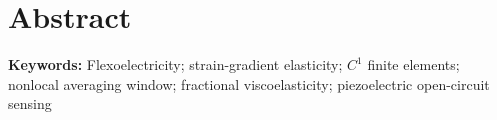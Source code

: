 \documentclass[11pt]{article}
\begin{document}
\section*{Abstract}

\bigskip
\noindent\textbf{Keywords:} Flexoelectricity; strain-gradient elasticity; $C^1$ finite elements; nonlocal averaging window; fractional viscoelasticity; piezoelectric open-circuit sensing
\end{document}
